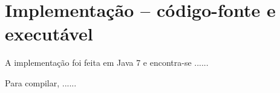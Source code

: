 \section{Implementação -- código-fonte e executável}

A implementação foi feita em Java 7 e encontra-se ......

Para compilar, ......

